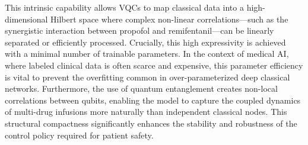 \documentclass[pdflatex,sn-mathphys-num]{sn-jnl}%
\theoremstyle{thmstyleone}%
\theoremstyle{thmstyletwo}%
\theoremstyle{thmstylethree}%
\begin{document}
This intrinsic capability allows VQCs to map classical data into a high-dimensional Hilbert space where complex non-linear correlations—such as the synergistic interaction between propofol and remifentanil—can be linearly separated or efficiently processed. Crucially, this high expressivity is achieved with a minimal number of trainable parameters. In the context of medical AI, where labeled clinical data is often scarce and expensive, this parameter efficiency is vital to prevent the overfitting common in over-parameterized deep classical networks. Furthermore, the use of quantum entanglement creates non-local correlations between qubits, enabling the model to capture the coupled dynamics of multi-drug infusions more naturally than independent classical nodes. This structural compactness significantly enhances the stability and robustness of the control policy required for patient safety.
\end{document}
